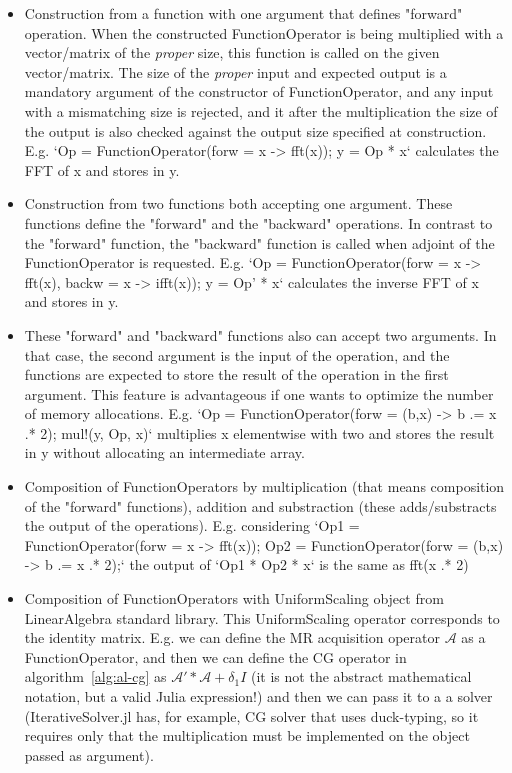 \begin{itemize}
    \item Construction from a function with one argument that defines "forward" operation. When the constructed FunctionOperator is being multiplied with a vector/matrix of the \textit{proper} size, this function is called on the given vector/matrix. The size of the \textit{proper} input and expected output is a mandatory argument of the constructor of FunctionOperator, and any input with a mismatching size is rejected, and it after the multiplication the size of the output is also checked against the output size specified at construction. E.g. `Op = FunctionOperator(forw = x -> fft(x)); y = Op * x` calculates the FFT of x and stores in y.
    \item Construction from two functions both accepting one argument. These functions define the "forward" and the "backward" operations. In contrast to the "forward" function, the "backward" function is called when adjoint of the FunctionOperator is requested. E.g. `Op = FunctionOperator(forw = x -> fft(x), backw = x -> ifft(x)); y = Op' * x` calculates the inverse FFT of x and stores in y.
    \item These "forward" and "backward" functions also can accept two arguments. In that case, the second argument is the input of the operation, and the functions are expected to store the result of the operation in the first argument. This feature is advantageous if one wants to optimize the number of memory allocations. E.g. `Op = FunctionOperator(forw = (b,x) -> b .= x .* 2); mul!(y, Op, x)` multiplies x elementwise with two and stores the result in y without allocating an intermediate array.
    \item Composition of FunctionOperators by multiplication (that means composition of the "forward" functions), addition and substraction (these adds/substracts the output of the operations). E.g. considering `Op1 = FunctionOperator(forw = x -> fft(x)); Op2 = FunctionOperator(forw = (b,x) -> b .= x .* 2);` the output of `Op1 * Op2 * x` is the same as fft(x .* 2)
    \item Composition of FunctionOperators with UniformScaling object from LinearAlgebra standard library. This UniformScaling operator corresponds to the identity matrix. E.g. we can define the MR acquisition operator $\mathcal{A}$ as a FunctionOperator, and then we can define the CG operator in algorithm~\ref{alg:al-cg} as $\mathcal{A}' * \mathcal{A} + \delta_1 I$ (it is not the abstract mathematical notation, but a valid Julia expression!) and then we can pass it to a a solver (IterativeSolver.jl has, for example, CG solver that uses duck-typing, so it requires only that the multiplication must be implemented on the object passed as argument).

\end{itemize}
